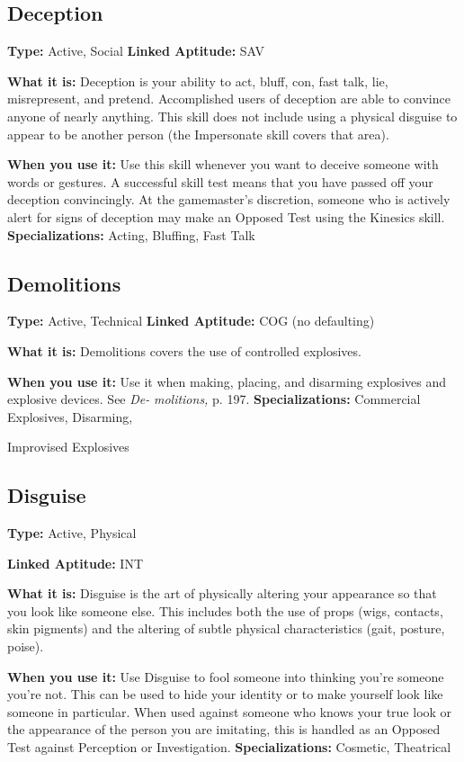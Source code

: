 \subsection{Deception}

\textbf{Type:} Active, Social
\textbf{Linked Aptitude:} SAV

\textbf{What it is:} Deception is your ability to act, bluff, 
con, fast talk, lie, misrepresent, and pretend. Accomplished
users of deception are able to convince anyone
of nearly anything. This skill does not include using a 
physical disguise to appear to be another person (the 
Impersonate skill covers that area).

\textbf{When you use it:} Use this skill whenever you want 
to deceive someone with words or gestures. A successful
skill test means that you have passed off your deception
convincingly. At the gamemaster's discretion,
someone who is actively alert for signs of deception 
may make an Opposed Test using the Kinesics skill.
\textbf{Specializations:} Acting, Bluffing, Fast Talk

\subsection{Demolitions}

\textbf{Type:} Active, Technical
\textbf{Linked Aptitude:} COG (no defaulting)

\textbf{What it is:} Demolitions covers the use of controlled 
explosives.

\textbf{When you use it:} Use it when making, placing, and 
disarming explosives and explosive devices. See \textit{De-}
\textit{molitions,} p. 197.
\textbf{Specializations:} Commercial Explosives, Disarming, 

Improvised Explosives

\subsection{Disguise}


\textbf{Type:} Active, Physical

\textbf{Linked Aptitude:} INT

\textbf{What it is: }Disguise is the art of physically altering 
your appearance so that you look like someone else. 
This includes both the use of props (wigs, contacts, 
skin pigments) and the altering of subtle physical 
characteristics (gait, posture, poise).

\textbf{When you use it:} Use Disguise to fool someone into 
thinking you're someone you're not. This can be used 
to hide your identity or to make yourself look like 
someone in particular. When used against someone 
who knows your true look or the appearance of the 
person you are imitating, this is handled as an Opposed
Test against Perception or Investigation.
\textbf{Specializations:} Cosmetic, Theatrical

